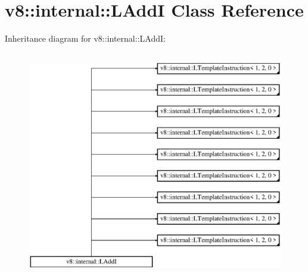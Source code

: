 \hypertarget{classv8_1_1internal_1_1_l_add_i}{}\section{v8\+:\+:internal\+:\+:L\+AddI Class Reference}
\label{classv8_1_1internal_1_1_l_add_i}
Inheritance diagram for v8\+:\+:internal\+:\+:L\+AddI\+:\begin{figure}[H]
\begin{center}
\leavevmode
\includegraphics[height=10.000000cm]{classv8_1_1internal_1_1_l_add_i}
\end{center}
\end{figure}
